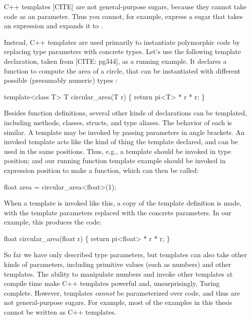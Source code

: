 C++ templates [CITE] are not general-purpose sugars,
because they cannot take code as an parameter. Thus you cannot, for
example, express a sugar that takes an expression  and expands
it to .

Instead, C++ templates are used
primarily to instantiate polymorphic code by replacing type parameters
with concrete types.  Let's use the following template declaration,
taken from [CITE: pg344], as a running example. It declares a function
to compute the area of a circle, that can be instantiated with
different possible (presumably numeric) types :
\begin{Codes}
template<class T>
T circular_area(T r) \{
  return pi<T> * r * r;
\}
\end{Codes}

Besides function definitions, several other kinds of declarations can
be templated, including methods, classes, structs, and type aliases.
The behavior of each is similar. A template may be invoked by passing
parameters in angle brackets. An invoked template acts like the
kind of thing the template declared, and can be used in the same
positions. Thus, e.g., a  template should be invoked in type
position; and our running function template example should be invoked
in expression position to make a function, which can then be called:
\begin{Codes}
  float area = circular_area<float>(1);
\end{Codes}
When a template is invoked like this, a copy of the template
definition is made, with the template parameters replaced with the
concrete parameters.
In our example, this produces the code:
\begin{Codes}
float circular_area(float r) \{
  return pi<float> * r * r;
\}
\end{Codes}

So far we have only described type parameters, but templates can also
take other kinds of parameters, including primitive values (such as
numbers) and other templates. The ability to manipulate numbers and
invoke other templates at compile time make C++ templates powerful
and, unsurprisingly, Turing complete. However, templates \emph{cannot}
be parameterized over code, and thus are not general-purpose sugars.
For example, most of the examples in this thesis cannot be written as
C++ templates.

